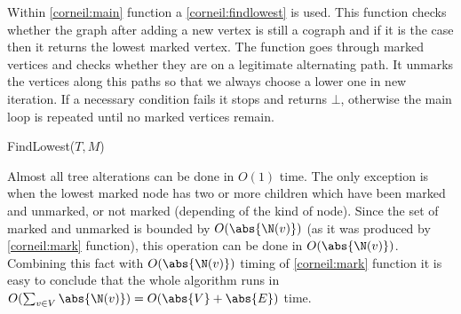 Within \ref{corneil:main} function a \ref{corneil:findlowest} is used. This function checks whether the graph after adding a new vertex is still a cograph and if it is the case then it returns the lowest marked vertex. The function goes through marked vertices and checks whether they are on a legitimate alternating path. It unmarks the vertices along this paths so that we always choose a lower one in new iteration. If a necessary condition fails it stops and returns $\bot$, otherwise the main loop is repeated until no marked vertices remain.

\begin{function}
    \caption{FindLowest($T, M$)}
    \label{corneil:findlowest}
    \DontPrintSemicolon

\end{function}

Almost all tree alterations can be done in $O(1)$ time. The only exception is when the lowest marked node has two or more children which have been marked and unmarked, or not marked (depending of the kind of node). Since the set of marked and unmarked is bounded by $O(\abs{\N(v)})$ (as it was produced by \ref{corneil:mark} function), this operation can be done in $O(\abs{\N(v)})$.
Combining this fact with $O(\abs{\N(v)})$ timing of \ref{corneil:mark} function it is easy to conclude that the whole algorithm runs in $O(\sum_{v \in V} \abs{\N(v)}) = O(\abs{V} + \abs{E})$ time.